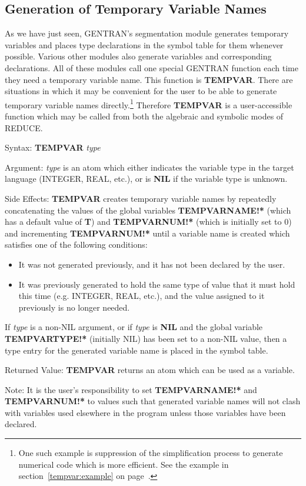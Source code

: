 \subsection{Generation of Temporary Variable Names}
\label{tempvars} 
As we have just seen, GENTRAN's segmentation module generates
temporary variables and places type declarations in the symbol table
for them whenever possible.  Various other modules also generate
variables and corresponding declarations.  All of these modules call
one special GENTRAN function each time they need a temporary
variable name.  This function is {\bf TEMPVAR}.  There are situations
in which it may be convenient for the user to be able to generate
temporary variable names directly.\footnote{One such example is suppression
of the simplification process to generate numerical code which is more
efficient.  See the example in section~\ref{tempvar:example} on
page~\pageref{tempvar:example}.}
Therefore {\bf TEMPVAR} 
is a user-accessible function which may be called from both
the algebraic and symbolic modes of REDUCE.
\begin{describe}{Syntax:}
{\bf TEMPVAR} {\it type}
\end{describe}
\begin{describe}{Argument:}
{\it type} is an atom which either indicates the variable type in the
target language (INTEGER, REAL, etc.), or is {\bf NIL} if the variable
type is unknown.
\end{describe}
\begin{describe}{Side Effects:}
{\bf TEMPVAR} creates temporary variable names by repeatedly concatenating
the values of the global variables {\bf TEMPVARNAME!*} (which has a
default value of {\bf T}) and {\bf TEMPVARNUM!*} (which is initially set
to 0) and incrementing {\bf TEMPVARNUM!*} until a variable name is created
which satisfies one of the following conditions:
\begin{itemize}
\item[{(1)}]
It was not generated previously, and it has not been declared by the user.
\item[{(2)}]
It was previously generated to hold the same type of value that it
must hold this time (e.g. INTEGER, REAL, etc.), and the value assigned
to it previously is no longer needed.
\end{itemize}
If {\it type} is a non-NIL argument, or if {\it type} is {\bf NIL}
and the global variable {\bf TEMPVARTYPE!*} (initially NIL) has been
set to a non-NIL value, then a type entry for the generated variable name
is placed in the symbol table.
\end{describe}
\begin{describe}{Returned Value:}
{\bf TEMPVAR} returns an atom which can be used as a variable.
\end{describe}
Note:  It is the user's responsibility to set {\bf TEMPVARNAME!*} and
{\bf TEMPVARNUM!*} to values such that generated variable
names will not clash with variables used elsewhere in the
program unless those variables have been declared.

